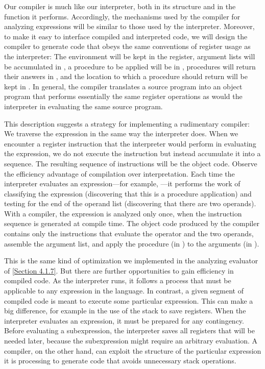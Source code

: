 Our compiler is much like our interpreter, both in its structure and in the function it performs.
Accordingly, the mechanisms used by the compiler for analyzing expressions will be similar to those used by the interpreter.
Moreover, to make it easy to interface compiled and interpreted code, we will design the compiler to generate code that obeys the same conventions of register usage as the interpreter:
The environment will be kept in the  register, argument lists will be accumulated in , a procedure to be applied will be in , procedures will return their answers in , and the location to which a procedure should return will be kept in .
In general, the compiler translates a source program into an object program that performs essentially the same register operations as would the interpreter in evaluating the same source program.

This description suggests a strategy for implementing a rudimentary compiler:
We traverse the expression in the same way the interpreter does.
When we encounter a register instruction that the interpreter would perform in evaluating the expression, we do not execute the instruction but instead accumulate it into a sequence.
The resulting sequence of instructions will be the object code.
Observe the efficiency advantage of compilation over interpretation.
Each time the interpreter evaluates an expression---for example, ---it performs the work of classifying the expression (discovering that this is a procedure application) and testing for the end of the operand list (discovering that there are two operands).
With a compiler, the expression is analyzed only once, when the instruction sequence is generated at compile time.
The object code produced by the compiler contains only the instructions that evaluate the operator and the two operands, assemble the argument list, and apply the procedure (in ) to the arguments (in ).

This is the same kind of optimization we implemented in the analyzing evaluator of \cref{Section 4.1.7}.
But there are further opportunities to gain efficiency in compiled code.
As the interpreter runs, it follows a process that must be applicable to any expression in the language.
In contrast, a given segment of compiled code is meant to execute some particular expression.
This can make a big difference, for example in the use of the stack to save registers.
When the interpreter evaluates an expression, it must be prepared for any contingency.
Before evaluating a subexpression, the interpreter saves all registers that will be needed later, because the subexpression might require an arbitrary evaluation.
A compiler, on the other hand, can exploit the structure of the particular expression it is processing to generate code that avoids unnecessary stack operations.

